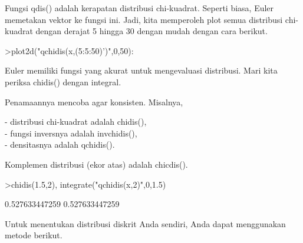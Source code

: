 \documentclass[a4paper,10pt]{article}
\begin{document}
\begin{eulernotebook}
\begin{eulercomment}
\begin{eulercomment}
\begin{eulercomment}
\begin{eulercomment}
\begin{eulercomment}
\begin{eulercomment}
\begin{eulercomment}
\begin{eulercomment}
\begin{eulercomment}
\begin{eulercomment}
\begin{eulercomment}
\begin{eulercomment}
\begin{eulercomment}
\begin{eulercomment}
\begin{eulercomment}
\begin{eulercomment}
\begin{eulercomment}
\begin{eulercomment}
\begin{eulercomment}
\begin{eulercomment}
\begin{eulercomment}
\begin{eulercomment}
\begin{eulercomment}
\begin{eulercomment}
\begin{eulercomment}
\begin{eulercomment}
\begin{eulercomment}
\begin{eulercomment}
\begin{eulercomment}
\begin{eulercomment}
\begin{eulercomment}
\begin{eulercomment}
\begin{eulercomment}
Fungsi qdis() adalah kerapatan distribusi chi-kuadrat. Seperti biasa,
Euler memetakan vektor ke fungsi ini. Jadi, kita memperoleh plot semua
distribusi chi-kuadrat dengan derajat 5 hingga 30 dengan mudah dengan
cara berikut.
\end{eulercomment}
\begin{eulerprompt}
>plot2d("qchidis(x,(5:5:50)')",0,50):
\end{eulerprompt}
\begin{eulercomment}
Euler memiliki fungsi yang akurat untuk mengevaluasi distribusi. Mari
kita periksa chidis() dengan integral.

Penamaannya mencoba agar konsisten. Misalnya,

- distribusi chi-kuadrat adalah chidis(),\\
- fungsi inversnya adalah invchidis(),\\
- densitasnya adalah qchidis().

Komplemen distribusi (ekor atas) adalah chicdis().
\end{eulercomment}
\begin{eulerprompt}
>chidis(1.5,2), integrate("qchidis(x,2)",0,1.5)
\end{eulerprompt}
\begin{euleroutput}
  0.527633447259
  0.527633447259
\end{euleroutput}
\begin{eulercomment}
Untuk menentukan distribusi diskrit Anda sendiri, Anda dapat
menggunakan metode berikut.


\end{eulercomment}
\end{eulercomment}
\end{eulercomment}
\end{eulercomment}
\end{eulercomment}
\end{eulercomment}
\end{eulercomment}
\end{eulercomment}
\end{eulercomment}
\end{eulercomment}
\end{eulercomment}
\end{eulercomment}
\end{eulercomment}
\end{eulercomment}
\end{eulercomment}
\end{eulercomment}
\end{eulercomment}
\end{eulercomment}
\end{eulercomment}
\end{eulercomment}
\end{eulercomment}
\end{eulercomment}
\end{eulercomment}
\end{eulercomment}
\end{eulercomment}
\end{eulercomment}
\end{eulercomment}
\end{eulercomment}
\end{eulercomment}
\end{eulercomment}
\end{eulercomment}
\end{eulercomment}
\end{eulercomment}
\end{eulernotebook}
\end{document}
